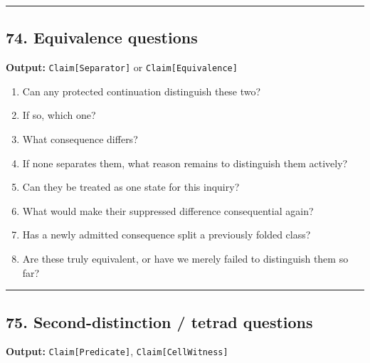 \documentclass[
]{article}
\providecommand{\tightlist}{%
  \setlength{\itemsep}{0pt}\setlength{\parskip}{0pt}}
\begin{document}
\begin{center}\rule{0.5\linewidth}{0.5pt}\end{center}

\subsection{74. Equivalence questions}\label{equivalence-questions}

\textbf{Output:} \texttt{Claim{[}Separator{]}} or
\texttt{Claim{[}Equivalence{]}}

\begin{enumerate}
\def\labelenumi{\arabic{enumi}.}
\tightlist
\item
  Can any protected continuation distinguish these two?
\item
  If so, which one?
\item
  What consequence differs?
\item
  If none separates them, what reason remains to distinguish them
  actively?
\item
  Can they be treated as one state for this inquiry?
\item
  What would make their suppressed difference consequential again?
\item
  Has a newly admitted consequence split a previously folded class?
\item
  Are these truly equivalent, or have we merely failed to distinguish
  them so far?
\end{enumerate}

\begin{center}\rule{0.5\linewidth}{0.5pt}\end{center}

\subsection{75. Second-distinction / tetrad
questions}\label{second-distinction-tetrad-questions}

\textbf{Output:} \texttt{Claim{[}Predicate{]}},
\texttt{Claim{[}CellWitness{]}}
\end{document}
